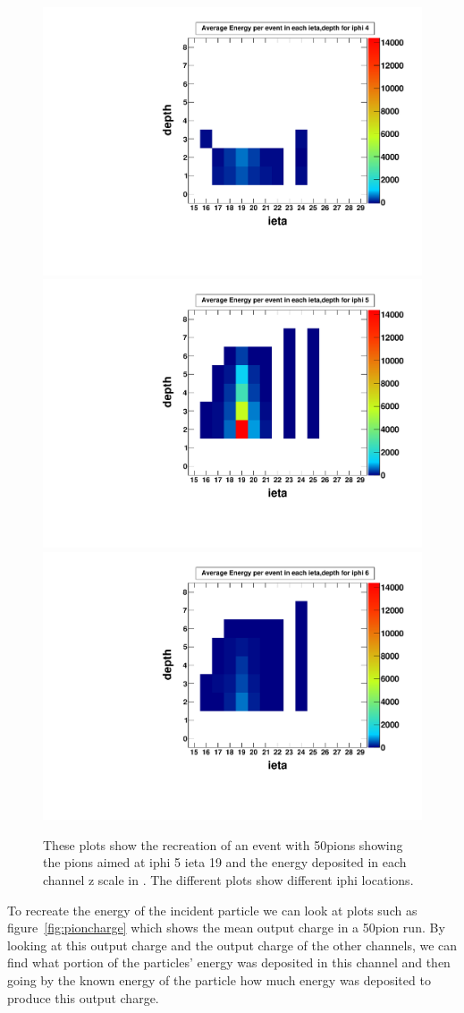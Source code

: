 \begin{figure}
\centering
\includegraphics[width=0.495\linewidth]{Figures/pionrun1.pdf}
\includegraphics[width=0.495\linewidth]{Figures/pionrun.pdf}
\includegraphics[width=0.495\linewidth]{Figures/pionrun2.pdf}
\caption{These plots show the recreation of an event with 50\GeV\space pions showing the pions aimed at iphi 5 ieta 19 and the energy deposited in each channel z scale in \MeV. The different plots show different iphi locations.}
\label{fig:pionmap}
\end{figure}

To recreate the energy of the incident particle we can look at plots such as figure~\ref{fig:pioncharge} which shows the mean output charge in a 50\GeV\space pion run. By looking at this output charge and the output charge of the other channels, we can find what portion of the particles' energy was deposited in this channel and then going by the known energy of the particle how much energy was deposited to produce this output charge. 

